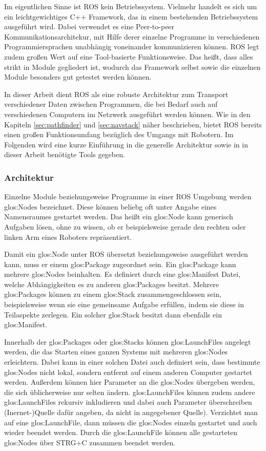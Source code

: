 Im eigentlichen Sinne ist \gls{ROS} kein Betriebssystem. Vielmehr handelt es sich um ein leichtgewichtiges C++ Framework, das in einem bestehenden Betriebssystem ausgeführt wird. Dabei verwendet es eine Peer-to-peer Kommunikationsarchitekur, mit Hilfe derer einzelne Programme in verschiedenen Programmiersprachen unabhängig voneinander kommunizieren können. \gls{ROS} legt zudem großen Wert auf eine Tool-basierte Funktionsweise. Das heißt, dass alles strikt in Module gegliedert ist, wodurch das Framework selbst sowie die einzelnen Module besonders gut getestet werden können.

In dieser Arbeit dient \gls{ROS} als eine robuste Architektur zum Transport verschiedener Daten zwischen Programmen, die bei Bedarf auch auf verschiedenen Computern im Netzwerk ausgeführt werden können. Wie in den Kapiteln \ref{sec:pathfinder} und \ref{sec:navstack} näher beschrieben, bietet \gls{ROS} bereits einen großen Funktionsumfang bezüglich des Umgangs mit Robotern. Im Folgenden wird eine kurze Einführung in die generelle Architektur sowie in in dieser Arbeit benötigte Tools gegeben.

\subsubsection{Architektur}

Einzelne Module beziehungsweise Programme in einer \gls{ROS} Umgebung werden \glspl{glos:Node} bezeichnet. Diese können beliebg oft unter Angabe eines Namensraumes gestartet werden. Das heißt ein \gls{glos:Node} kann generisch Aufgaben lösen, ohne zu wissen, ob er beispielsweise gerade den rechten oder linken Arm eines Roboters repräsentiert.

Damit ein \gls{glos:Node} unter \gls{ROS} übersetzt beziehungsweise ausgeführt werden kann, muss er einem \gls{glos:Package} zugeordnet sein. Ein \gls{glos:Package} kann mehrere \glspl{glos:Node} beinhalten. Es definiert durch eine \gls{glos:Manifest} Datei, welche Abhängigkeiten es zu anderen \glspl{glos:Package} besitzt. Mehrere \glspl{glos:Package} können zu einem \gls{glos:Stack} zusammengeschlossen sein, beispielsweise wenn sie eine gemeinsame Aufgabe erfüllen, indem sie diese in Teilaspekte zerlegen. Ein solcher \gls{glos:Stack} besitzt dann ebenfalls ein \gls{glos:Manifest}.

Innerhalb der \glspl{glos:Package} oder \glspl{glos:Stack} können \glspl{glos:LaunchFile} angelegt werden, die das Starten eines ganzen Systems mit mehreren \glspl{glos:Node} erleichtern. Dabei kann in einer solchen Datei auch definiert sein, dass bestimmte \glspl{glos:Node} nicht lokal, sondern entfernt auf einem anderen Computer gestartet werden. Außerdem können hier Parameter an die \glspl{glos:Node} übergeben werden, die sich üblicherweise nur selten ändern. \glspl{glos:LaunchFile} können zudem andere \glspl{glos:LaunchFile} rekursiv inkludieren und dabei auch Parameter überschreiben{\color{red} (Inernet-)Quelle dafür angeben, da nicht in angegebener Quelle)}. Verzichtet man auf eine \gls{glos:LaunchFile}, dann müssen die \glspl{glos:Node} einzeln gestartet und auch wieder beendet werden. Durch die \gls{glos:LaunchFile} können alle gestarteten \glspl{glos:Node} über STRG+C zusammen beendet werden.

